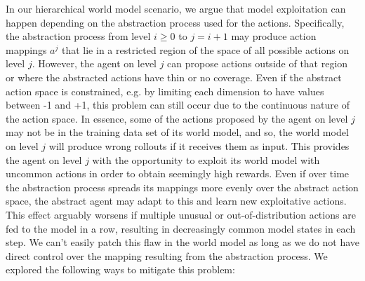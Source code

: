 \documentclass{article}
\begin{document}
In our hierarchical world model scenario, we argue that model exploitation can happen depending on the abstraction process used for the actions. 
Specifically, the abstraction process from level $i \geq 0$ to $j = i + 1$ may produce action mappings $a^j$ that lie in a restricted region of the space of all possible actions on level $j$. 
However, the agent on level $j$ can propose actions outside of that region or where the abstracted actions have thin or no coverage. 
Even if the abstract action space is constrained, e.g. by limiting each dimension to have values between -1 and +1, this problem can still occur due to the continuous nature of the action space. 
In essence, some of the actions proposed by the agent on level $j$ may not be in the training data set of its world model, and so, the world model on level $j$ will produce wrong rollouts if it receives them as input. 
This provides the agent on level $j$ with the opportunity to exploit its world model with uncommon actions in order to obtain seemingly high rewards.
Even if over time the abstraction process spreads its mappings more evenly over the abstract action space, the abstract agent may adapt to this and learn new exploitative actions.
This effect arguably worsens if multiple unusual or out-of-distribution actions are fed to the model in a row, resulting in decreasingly common model states in each step.
We can't easily patch this flaw in the world model as long as we do not have direct control over the mapping resulting from the abstraction process. 
We explored the following ways to mitigate this problem:
\end{document}
